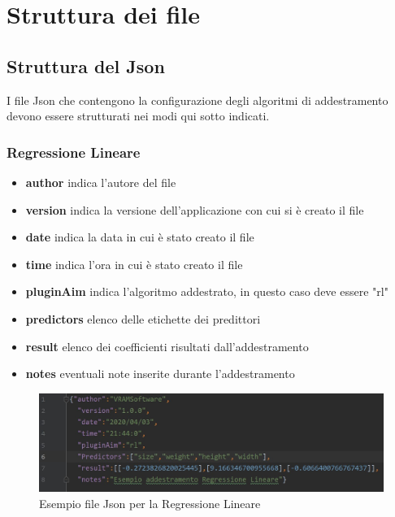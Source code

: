 \section{Struttura dei file}
	\subsection{Struttura del Json}
	I file Json che contengono la configurazione degli algoritmi di addestramento devono essere strutturati nei modi qui sotto indicati.
		\subsubsection{Regressione Lineare}
		\begin{itemize}
			\item \textbf{author} indica l'autore del file
			\item \textbf{version} indica la versione dell'applicazione con cui si è creato il file
			\item \textbf{date} indica la data in cui è stato creato il file
			\item \textbf{time} indica l'ora in cui è stato creato il file
			\item \textbf{pluginAim} indica l'algoritmo addestrato, in questo caso deve essere "rl"
			\item \textbf{predictors} elenco delle etichette dei predittori
			\item \textbf{result} elenco dei coefficienti risultati dall'addestramento
			\item \textbf{notes} eventuali note inserite durante l'addestramento
		\end{itemize}
		\mbox{}
		\begin{figure} [H]
			\begin{center}
				\includegraphics[width=\linewidth]{./img/jsonRl.jpg}
			\end{center}
			\caption{Esempio file Json per la Regressione Lineare}
		\end{figure}
		\mbox{}
